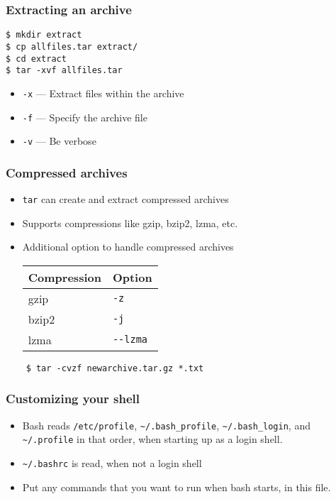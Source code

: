 \documentclass[12pt,compress]{beamer}
\begin{document}
\begin{frame}[fragile]
\frametitle{Extracting an archive}

\begin{lstlisting}
$ mkdir extract 
$ cp allfiles.tar extract/ 
$ cd extract 
$ tar -xvf allfiles.tar
\end{lstlisting} %

\begin{itemize}
\item \texttt{-x} --- Extract files within the archive
\item \texttt{-f} --- Specify the archive file
\item \texttt{-v} --- Be verbose
\end{itemize}
\end{frame}

\begin{frame}[fragile]
  \frametitle{Compressed archives}
  \begin{itemize}
  \item \texttt{tar} can create and extract compressed archives
  \item Supports compressions like gzip, bzip2, lzma, etc.
  \item Additional option to handle compressed archives
    \begin{center}
      \begin{tabular}{|l|l|}\hline
        Compression      &  Option   \\\hline
        gzip   &  \texttt{-z}        \\\hline
        bzip2  &  \texttt{-j}        \\\hline
        lzma   &  \texttt{-{}-lzma}  \\\hline
      \end{tabular}
    \end{center}
  \end{itemize}
  \begin{lstlisting}
    $ tar -cvzf newarchive.tar.gz *.txt
  \end{lstlisting} %
\end{frame}


\begin{frame}
\frametitle{Customizing your shell}
\begin{itemize}
\item Bash reads \texttt{/etc/profile},
  \texttt{\textasciitilde{}/.bash\_profile},
  \texttt{\textasciitilde{}/.bash\_login}, and
  \texttt{\textasciitilde{}/.profile} in that order, when starting
  up as a login shell. 
\item \texttt{\textasciitilde{}/.bashrc} is read, when not a login
  shell 
\item Put any commands that you want to run when bash starts, in this
  file. 
\end{itemize}
\end{frame}
\end{document}

